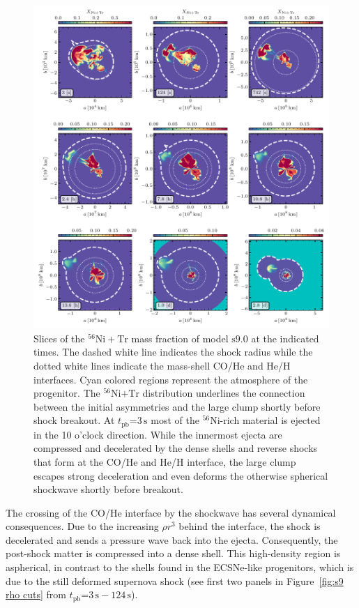 \documentclass[fleqn,usenatbib]{mnras}
\newcommand{\tpb}{\ensuremath{t_{\text{pb}}}}
\newcommand{\nickel}{\ensuremath{\mathrm{^{56}Ni}}\xspace}
\newcommand{\tracer}{\ensuremath{\mathrm{Tr}}\xspace}
\newcommand{\s}{\ensuremath{\text{s}}}
\newcommand{\snine}{\ensuremath{\mathrm{s9.0}}\xspace}
\begin{document}
\begin{figure}%
\centering
\includegraphics[width=\textwidth]{pic/s9_3d_3x3_NiX.pdf}
    \caption{Slices of the $\nickel+\tracer$ mass fraction of model \snine at the indicated times. The dashed white line indicates the shock radius while the dotted white 
    lines indicate the mass-shell CO/He and He/H interfaces. Cyan colored regions represent the atmosphere of the progenitor. 
    The $\nickel\mathord{+}\tracer$ distribution underlines the connection between the initial asymmetries and the 
    large clump shortly before shock breakout. 
    At $\tpb\mathord{=}3\,\s$ most of the \nickel-rich material is ejected in the 10 o'clock direction. While
    the innermost ejecta are compressed and decelerated by the dense shells and reverse shocks that 
    form at the CO/He and He/H interface, the large clump escapes strong deceleration and even deforms the 
    otherwise spherical shockwave shortly before breakout.
    }
\label{fig:s9 nix cuts}
\end{figure}%

The crossing of the CO/He interface by the shockwave has several dynamical consequences. 
Due to the increasing $\rho r^3$ behind the interface, the shock is 
decelerated and sends a pressure wave back into the ejecta. Consequently, 
the post-shock matter is compressed into a
dense shell. This high-density region is aspherical,
in contrast to the shells found in the ECSNe-like progenitors, which is due to the still  
deformed supernova shock (see first two panels in Figure~\ref{fig:s9 rho cuts} 
from  $\tpb\mathord{=}3\,\s-124\,\s$).
\end{document}
